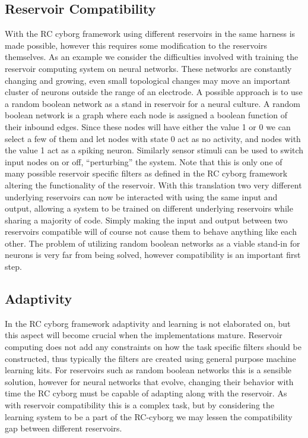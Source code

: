 \subsection{Reservoir Compatibility}
With the RC cyborg framework using different reservoirs in the same harness is
made possible, however this requires some modification to the reservoirs
themselves.
As an example we consider the difficulties involved with training the reservoir
computing system on neural networks.
These networks are constantly changing and growing, even small topological
changes may move an important cluster of neurons outside the range of an
electrode.
A possible approach is to use a random boolean network as a stand in reservoir for a
neural culture.
A random boolean network is a graph where each node is assigned a boolean function
of their inbound edges.
Since these nodes will have either the value 1 or 0 we can select a few of them
and let nodes with state 0 act as no activity, and nodes with the value 1 act as
a spiking neuron.
Similarly sensor stimuli can be used to switch input nodes on or off,
``perturbing'' the system.
Note that this is only one of many possible reservoir specific filters as
defined in the RC cyborg framework altering the functionality of the reservoir.
With this translation two very different underlying reservoirs can now be
interacted with using the same input and output, allowing a system to be trained
on different underlying reservoirs while sharing a majority of code.
Simply making the input and output between two reservoirs compatible will of
course not cause them to behave anything like each other.
The problem of utilizing random boolean networks as a viable stand-in for
neurons is very far from being solved, however compatibility is an important
first step.
\subsection{Adaptivity}
In the RC cyborg framework adaptivity and learning is not elaborated on, but
this aspect will become crucial when the implementations mature.
Reservoir computing does not add any constraints on how the task specific
filters should be constructed, thus typically the filters are created using
general purpose machine learning kits.
For reservoirs such as random boolean networks this is a sensible solution,
however for neural networks that evolve, changing their behavior with time the
RC cyborg must be capable of adapting along with the reservoir.
As with reservoir compatibility this is a complex task, but by considering the
learning system to be a part of the RC-cyborg we may lessen the compatibility
gap between different reservoirs.